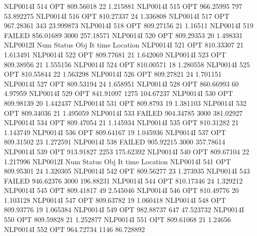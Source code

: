 NLP0014I           514         OPT 809.56018       22 1.215881
NLP0014I           515         OPT 966.25995      797 53.892275
NLP0014I           516         OPT 810.27337       24 1.336808
NLP0014I           517         OPT 967.28361      343 23.999873
NLP0014I           518         OPT 809.27156       21 1.16511
NLP0014I           519      FAILED 856.01689     3000 257.18571
NLP0014I           520         OPT 809.29353       20 1.498331
NLP0012I 
              Num      Status      Obj             It       time                 Location
NLP0014I           521         OPT 810.33307       21 1.613491
NLP0014I           522         OPT 809.77681       21 1.642069
NLP0014I           523         OPT 809.38956       21 1.555156
NLP0014I           524         OPT 810.00571       18 1.280558
NLP0014I           525         OPT 810.55844       22 1.563298
NLP0014I           526         OPT 809.27821       24 1.701151
NLP0014I           527         OPT 809.53194       24 1.658951
NLP0014I           528         OPT 860.66993       60 4.97959
NLP0014I           529         OPT 841.91097     1275 104.67237
NLP0014I           530         OPT 809.98139       20 1.442437
NLP0014I           531         OPT 809.8793       19 1.381103
NLP0014I           532         OPT 809.34036       21 1.495059
NLP0014I           533      FAILED 904.34785     3000 381.02927
NLP0014I           534         OPT 809.47054       21 1.145934
NLP0014I           535         OPT 810.31282       21 1.143749
NLP0014I           536         OPT 809.64167       19 1.045936
NLP0014I           537         OPT 809.31502       23 1.272591
NLP0014I           538      FAILED 905.92215     3000 357.78614
NLP0014I           539         OPT 913.91827     2253 175.62392
NLP0014I           540         OPT 809.67104       22 1.217996
NLP0012I 
              Num      Status      Obj             It       time                 Location
NLP0014I           541         OPT 809.95301       24 1.320305
NLP0014I           542         OPT 809.56277       23 1.273935
NLP0014I           543      FAILED 946.62376     3000 196.88231
NLP0014I           544         OPT 810.17346       24 1.329212
NLP0014I           545         OPT 809.41817       49 2.545046
NLP0014I           546         OPT 810.49776       20 1.103128
NLP0014I           547         OPT 809.63782       19 1.060418
NLP0014I           548         OPT 809.93776       19 1.065384
NLP0014I           549         OPT 982.88737      647 47.523732
NLP0014I           550         OPT 809.59828       21 1.252877
NLP0014I           551         OPT 809.61068       21 1.24656
NLP0014I           552         OPT 964.72734     1146 86.728892
